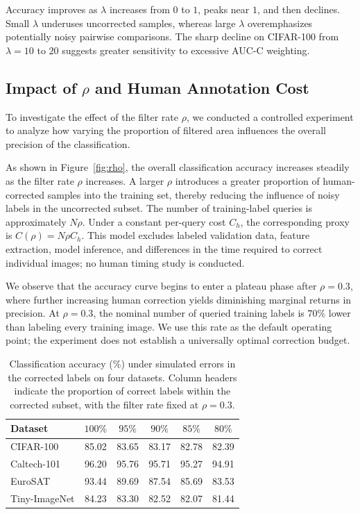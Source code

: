 \documentclass[10pt,twocolumn,letterpaper]{article}
\begin{document}
Accuracy improves as $\lambda$ increases from $0$ to $1$, peaks near $1$, and then declines. Small $\lambda$ underuses uncorrected samples, whereas large $\lambda$ overemphasizes potentially noisy pairwise comparisons. The sharp decline on CIFAR-100 from $\lambda=10$ to $20$ suggests greater sensitivity to excessive AUC-C weighting.


\subsection{Impact of \texorpdfstring{$\rho$}{rho} and Human Annotation Cost}
To investigate the effect of the filter rate $\rho$, we conducted a controlled experiment to analyze how varying the proportion of filtered area influences the overall precision of the classification.

As shown in Figure~\ref{fig:rho}, the overall classification accuracy increases steadily as the filter rate $\rho$ increases. A larger $\rho$ introduces a greater proportion of human-corrected samples into the training set, thereby reducing the influence of noisy labels in the uncorrected subset. The number of training-label queries is approximately $N\rho$. Under a constant per-query cost $C_h$, the corresponding proxy is $C(\rho)=N\rho C_h$. This model excludes labeled validation data, feature extraction, model inference, and differences in the time required to correct individual images; no human timing study is conducted.

We observe that the accuracy curve begins to enter a plateau phase after $\rho=0.3$, where further increasing human correction yields diminishing marginal returns in precision. At $\rho=0.3$, the nominal number of queried training labels is $70\%$ lower than labeling every training image. We use this rate as the default operating point; the experiment does not establish a universally optimal correction budget.

\begin{table}[!t]
\caption{Classification accuracy (\%) under simulated errors in the corrected labels on four datasets. Column headers indicate the proportion of correct labels within the corrected subset, with the filter rate fixed at $\rho=0.3$.}
\label{tab:human-correction-noise}



\centering
\small
\setlength{\tabcolsep}{3pt}
\begin{tabular*}{\columnwidth}{@{\extracolsep{\fill}}lccccc}
\toprule
Dataset & $100\%$ & $95\%$ & $90\%$ & $85\%$ & $80\%$ \\
\midrule
CIFAR-100     & 85.02 & 83.65 & 83.17 & 82.78 & 82.39 \\
Caltech-101   & 96.20 & 95.76 & 95.71 & 95.27 & 94.91 \\
EuroSAT       & 93.44 & 89.69 & 87.54 & 85.69 & 83.53 \\
Tiny-ImageNet & 84.23 & 83.30 & 82.52 & 82.07 & 81.44 \\
\bottomrule
\end{tabular*}

\end{table}
\end{document}
